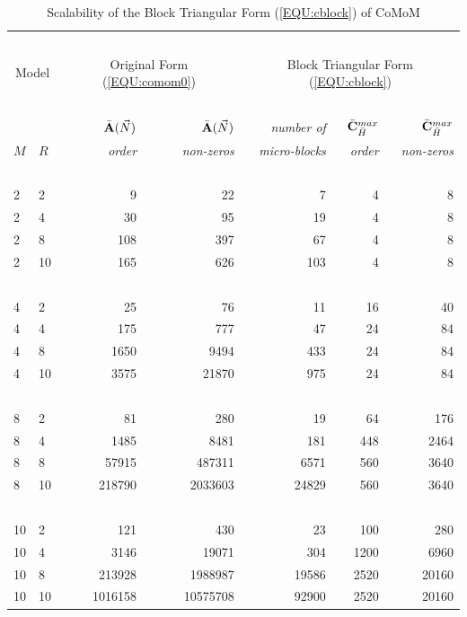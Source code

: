 \documentclass[journal,twocolumn,9.5pt]{IEEEtran}
\newcommand{\comom}[1]{\bar{#1}}
\begin{document}
\begin{table}[t!]
\centering
\caption{Scalability of the Block Triangular Form (\ref{EQU:cblock}) of CoMoM}
\begin{tabular}{|p{6pt}p{6pt}|rr|rrr|}
\hline
&  &  &  &  &  & ~\\[-8pt]
\multicolumn{2}{|c|}{\sc Model} & \multicolumn{2}{|c|}{\sc Original Form (\ref{EQU:comom0})} & \multicolumn{3}{|c|}{\sc Block Triangular Form (\ref{EQU:cblock})}\\
\hline
&  &  &  &  &  & ~\\[-6pt]
&  & $\comom{\bf A}(\vec N)$ & $\comom{\bf A}(\vec N)$ & \textit{number of} & $\comom{\bf C}^{max}_{\comom{H}}$ & $\comom{\bf C}^{max}_{\comom{H}}$ \\
$M$ & $R$ &  \textit{order} & \textit{non-zeros} & \textit{micro-blocks} & \textit{order} & \textit{non-zeros} \\
\hline
&  &  &  &  &  & ~\\[-8pt]
2 & 2 & 9 & 22 &7 & 4 & 8 \\
2 & 4 & 30 & 95 &19 & 4 & 8 \\
2 & 8 & 108 & 397 &67 & 4 & 8 \\
2 & 10 & 165 & 626 &103 & 4 & 8 \\
\hline
&  &  &  &  &  & ~\\[-8pt]
4 & 2 & 25 & 76 &11 & 16 & 40 \\
4 & 4 & 175 & 777 &47 & 24 & 84 \\
4 & 8 & 1650 & 9494 &433 & 24 & 84 \\
4 & 10 & 3575 & 21870 &975 & 24 & 84 \\
\hline
&  &  &  &  &  & ~\\[-8pt]
8 & 2 & 81 & 280 &19 & 64 & 176 \\
8 & 4 & 1485 & 8481 &181 & 448 & 2464 \\
8 & 8 & 57915 & 487311 &6571 & 560 & 3640 \\
8 & 10 & 218790 & 2033603 &24829 & 560 & 3640 \\
\hline
&  &  &  &  &  & ~\\[-8pt]
10 & 2 & 121 & 430 &23 & 100 & 280 \\
10 & 4 & 3146 & 19071 &304 & 1200 & 6960 \\
10 & 8 & 213928 & 1988987 &19586 & 2520 & 20160  \\
10 & 10 & 1016158 & 10575708 & 92900 & 2520 & 20160 \\
\hline
\end{tabular}
\label{TAB:Areduction}
\end{table}
\end{document}
